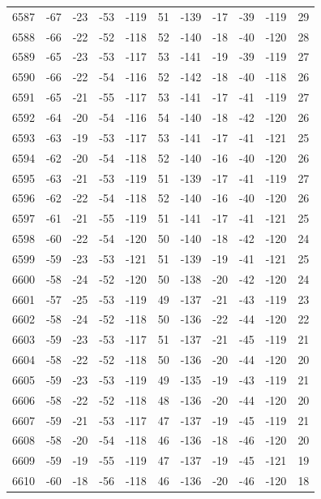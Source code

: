 \begin{table}[H]
\begin{tabular}{lllllllllll}
6587 & -67 & -23 & -53 & -119 & 51 & -139 & -17 & -39 & -119 & 29 \\
6588 & -66 & -22 & -52 & -118 & 52 & -140 & -18 & -40 & -120 & 28 \\
6589 & -65 & -23 & -53 & -117 & 53 & -141 & -19 & -39 & -119 & 27 \\
6590 & -66 & -22 & -54 & -116 & 52 & -142 & -18 & -40 & -118 & 26 \\
6591 & -65 & -21 & -55 & -117 & 53 & -141 & -17 & -41 & -119 & 27 \\
6592 & -64 & -20 & -54 & -116 & 54 & -140 & -18 & -42 & -120 & 26 \\
6593 & -63 & -19 & -53 & -117 & 53 & -141 & -17 & -41 & -121 & 25 \\
6594 & -62 & -20 & -54 & -118 & 52 & -140 & -16 & -40 & -120 & 26 \\
6595 & -63 & -21 & -53 & -119 & 51 & -139 & -17 & -41 & -119 & 27 \\
6596 & -62 & -22 & -54 & -118 & 52 & -140 & -16 & -40 & -120 & 26 \\
6597 & -61 & -21 & -55 & -119 & 51 & -141 & -17 & -41 & -121 & 25 \\
6598 & -60 & -22 & -54 & -120 & 50 & -140 & -18 & -42 & -120 & 24 \\
6599 & -59 & -23 & -53 & -121 & 51 & -139 & -19 & -41 & -121 & 25 \\
6600 & -58 & -24 & -52 & -120 & 50 & -138 & -20 & -42 & -120 & 24 \\
6601 & -57 & -25 & -53 & -119 & 49 & -137 & -21 & -43 & -119 & 23 \\
6602 & -58 & -24 & -52 & -118 & 50 & -136 & -22 & -44 & -120 & 22 \\
6603 & -59 & -23 & -53 & -117 & 51 & -137 & -21 & -45 & -119 & 21 \\
6604 & -58 & -22 & -52 & -118 & 50 & -136 & -20 & -44 & -120 & 20 \\
6605 & -59 & -23 & -53 & -119 & 49 & -135 & -19 & -43 & -119 & 21 \\
6606 & -58 & -22 & -52 & -118 & 48 & -136 & -20 & -44 & -120 & 20 \\
6607 & -59 & -21 & -53 & -117 & 47 & -137 & -19 & -45 & -119 & 21 \\
6608 & -58 & -20 & -54 & -118 & 46 & -136 & -18 & -46 & -120 & 20 \\
6609 & -59 & -19 & -55 & -119 & 47 & -137 & -19 & -45 & -121 & 19 \\
6610 & -60 & -18 & -56 & -118 & 46 & -136 & -20 & -46 & -120 & 18 \\

\end{tabular}
\end{table}
